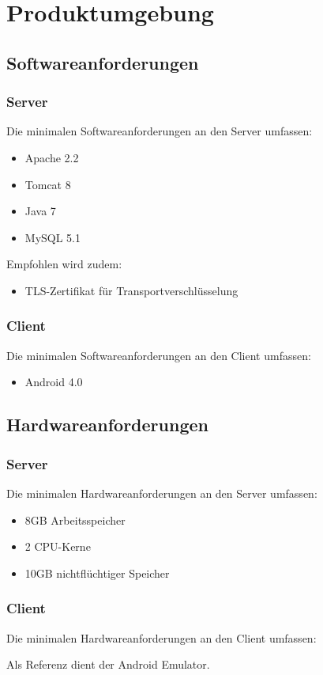 \section{Produktumgebung}
\subsection{Softwareanforderungen}

\subsubsection{Server}
Die minimalen Softwareanforderungen an den Server umfassen:
\begin{itemize}
\item Apache 2.2
\item Tomcat 8
\item Java 7
\item MySQL 5.1

\end{itemize}

Empfohlen wird zudem:
\begin{itemize}
\item TLS-Zertifikat für Transportverschlüsselung
\end{itemize}

\subsubsection{Client}
Die minimalen Softwareanforderungen an den Client umfassen:
\begin{itemize}
\item Android 4.0

\end{itemize}


\subsection{Hardwareanforderungen}
\subsubsection{Server}
Die minimalen Hardwareanforderungen an den Server umfassen:
\begin{itemize}
\item 8GB Arbeitsspeicher
\item 2 CPU-Kerne
\item 10GB nichtflüchtiger Speicher
\end{itemize}

\subsubsection{Client}
Die minimalen Hardwareanforderungen an den Client umfassen:
\begin{itemize}
\end{itemize}

Als Referenz dient der Android Emulator.

